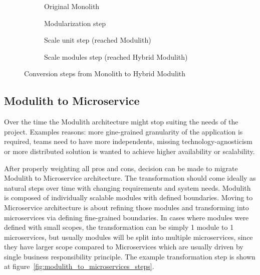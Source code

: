 \begin{figure}
    \centering
    \begin{subfigure}{.5\textwidth}
        \centering
        
        \caption{Original Monolith}
    \end{subfigure}%
    \begin{subfigure}{.5\textwidth}
        \centering
        
        \caption{Modularization step}
    \end{subfigure}
    \begin{subfigure}{\textwidth}
        \centering
        
        \caption{Scale unit step (reached Modulith)}
    \end{subfigure}%
    \hfill
    \begin{subfigure}{\textwidth}
        \centering
        
        \caption{Scale modules step (reached Hybrid Modulith)}
    \end{subfigure}
    \caption{Conversion steps from Monolith to Hybrid Modulith}
    \label{fig:monolith_to_modulith_steps}
\end{figure}


\subsection{Modulith to Microservice}
Over the time the Modulith architecture might stop suiting the needs of the project. Examples reasons: more gine-grained granularity of the application is required, teams need to have more independents, missing technology-agnosticism or more distributed solution is wanted to achieve higher availability or scalability.

After properly weighting all pros and cons, decision can be made to migrate Modulith to Microservice architecture. The transformation should come ideally as natural steps over time with changing requirements and system needs. Modulith is composed of individually scalable modules with defined boundaries. Moving to Microservice architecture is about refining those modules and transforming into microservices via defining fine-grained boundaries. In cases where modules were defined with small scopes, the transformation can be simply 1 module to 1 microservices, but usually modules will be split into multiple microservices, since they have larger scope compared to Microservices which are usually driven by single business responsibility principle. The example transformation step is shown at figure~\ref{fig:modulith_to_microservices_steps}.

